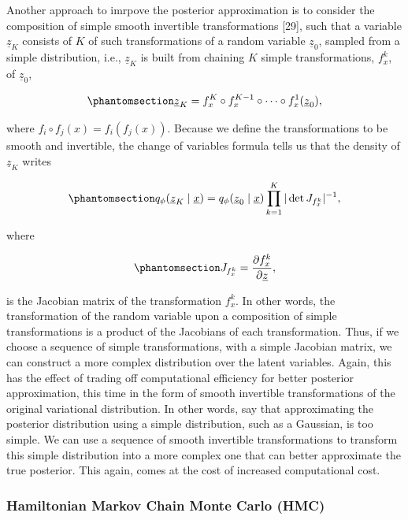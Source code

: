 \documentclass[
]{scrartcl}
\begin{document}
\begin{refsection}
Another approach to imrpove the posterior approximation is to consider
the composition of simple smooth invertible transformations {[}29{]},
such that a variable \(\underline{z}_K\) consists of \(K\) of such
transformations of a random variable \(\underline{z}_0\), sampled from a
simple distribution, i.e., \(\underline{z}_K\) is built from chaining
\(K\) simple transformations, \(f_x^k\), of \(\underline{z}_0\),

\begin{equation}\phantomsection\label{eq-normalizing-flow}{
\underline{z}_K = 
f_x^K \circ f_x^{K-1} \circ \cdots \circ f_x^1(\underline{z}_0),
}\end{equation}

where \(f_i \circ f_j(x) = f_i(f_j(x))\). Because we define the
transformations to be smooth and invertible, the change of variables
formula tells us that the density of \(\underline{z}_K\) writes

\begin{equation}\phantomsection\label{eq-flow-density}{
q_\phi(\underline{z}_K \mid \underline{x}) = 
q_\phi(\underline{z}_0 \mid \underline{x}) \prod_{k=1}^K |\det J_{f_x^k}|^{-1},
}\end{equation}

where

\begin{equation}\phantomsection\label{eq-jacobian}{
J_{f_x^k} = \frac{\partial f_x^k}{\partial \underline{z}},
}\end{equation}

is the Jacobian matrix of the transformation \(f_x^k\). In other words,
the transformation of the random variable upon a composition of simple
transformations is a product of the Jacobians of each transformation.
Thus, if we choose a sequence of simple transformations, with a simple
Jacobian matrix, we can construct a more complex distribution over the
latent variables. Again, this has the effect of trading off
computational efficiency for better posterior approximation, this time
in the form of smooth invertible transformations of the original
variational distribution. In other words, say that approximating the
posterior distribution using a simple distribution, such as a Gaussian,
is too simple. We can use a sequence of smooth invertible
transformations to transform this simple distribution into a more
complex one that can better approximate the true posterior. This again,
comes at the cost of increased computational cost.

\subsubsection{Hamiltonian Markov Chain Monte Carlo
(HMC)}\label{hamiltonian-markov-chain-monte-carlo-hmc}


\end{refsection}
\end{document}
